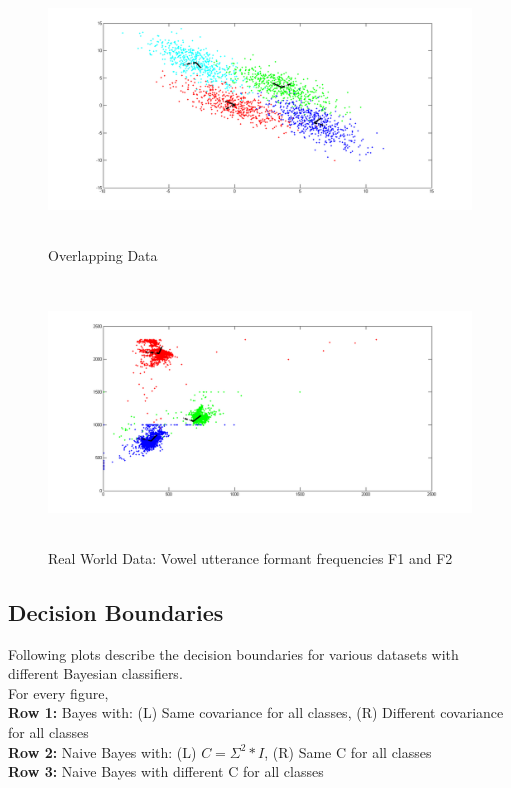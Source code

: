\documentclass[11pt,a4paper]{article}
\begin{document}
\clearpage
\begin{figure}[H]
		\centering
\includegraphics[height=7cm]{Figures/OD_eig.png}
\caption{Overlapping Data}
\end{figure}

\begin{figure}[H]
	\centering
\includegraphics[height=7cm]{Figures/RWD_eig.png}
\caption{Real World Data: Vowel utterance formant frequencies F1 and F2}
\end{figure}

\clearpage
\subsection{Decision Boundaries}
Following plots describe the decision boundaries for various datasets with different Bayesian classifiers. \\

For every figure,\\
\textbf{Row 1:} Bayes with: (L) Same covariance for all classes, (R) Different covariance for all classes\\
\textbf{Row 2:\textbf{}} Naive Bayes with: (L) $C = \Sigma^2*I$, (R) Same C for all classes\\
\textbf{Row 3:} Naive Bayes with different C for all classes\\
\end{document}
